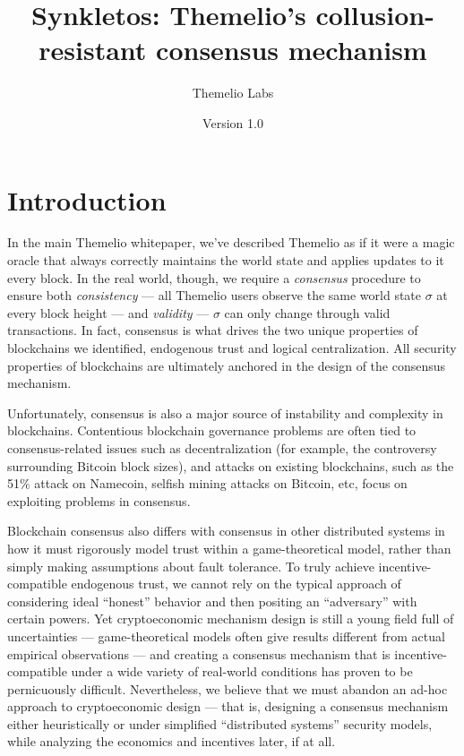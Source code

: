 \documentclass[letterpaper,12pt,oneside]{article}
\begin{document}
\raggedbottom
\title{Synkletos: Themelio's collusion-resistant consensus mechanism}
\author{Themelio Labs}
\date{Version 1.0}
\maketitle



\tableofcontents


\section{Introduction}

In the main Themelio whitepaper, we've described Themelio as if it were a magic oracle that always correctly maintains the world state and applies updates to it every block. In the real world, though, we require a \emph{consensus} procedure to ensure both \emph{consistency} --- all Themelio users observe the same world state $\sigma$ at every block height --- and \emph{validity} --- $\sigma$ can only change through valid transactions. In fact, consensus is what drives the two unique properties of blockchains we identified, endogenous trust and logical centralization. All security properties of blockchains are ultimately anchored in the design of the consensus mechanism.

Unfortunately, consensus is also a major source of instability and complexity in blockchains. Contentious blockchain governance problems are often tied to consensus-related issues such as decentralization (for example, the controversy surrounding Bitcoin block sizes), and attacks on existing blockchains, such as the 51\% attack on Namecoin, selfish mining attacks on Bitcoin, etc, focus on exploiting problems in consensus.

Blockchain consensus also differs with consensus in other distributed systems in how it must rigorously model trust within a game-theoretical model, rather than simply making assumptions about fault tolerance. To truly achieve incentive-compatible endogenous trust, we cannot rely on the typical approach of considering ideal ``honest'' behavior and then positing an ``adversary'' with certain powers. Yet cryptoeconomic mechanism design is still a young field full of uncertainties --- game-theoretical models often give results different from actual empirical observations --- and creating a consensus mechanism that is incentive-compatible under a wide variety of real-world conditions has proven to be pernicuously difficult. Nevertheless, we believe that we must abandon an ad-hoc approach to cryptoeconomic design --- that is, designing a consensus mechanism either heuristically or under simplified ``distributed systems'' security models, while analyzing the economics and incentives later, if at all.
\end{document}
